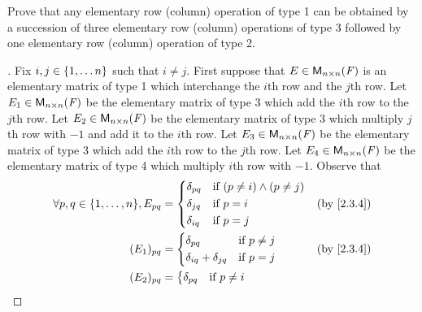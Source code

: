 \begin{ex}\label{ex:3.1.9}
  Prove that any elementary row (column) operation of type 1 can be obtained by a succession of three elementary row (column) operations of type 3 followed by one elementary row (column) operation of type 2.
\end{ex}

\begin{proof}[]
  Fix \(i, j \in \left\lbrace1, \dots n\right\rbrace\) such that \(i \neq j\).
  First suppose that \(E \in \ms[n][n][\F]\) is an elementary matrix of type 1 which interchange the \(i\)th row and the \(j\)th row.
  Let \(E_1 \in \ms[n][n][\F]\) be the elementary matrix of type 3 which add the \(i\)th row to the \(j\)th row.
  Let \(E_2 \in \ms[n][n][\F]\) be the elementary matrix of type 3 which multiply \(j\)th row with \(-1\) and add it to the \(i\)th row.
  Let \(E_3 \in \ms[n][n][\F]\) be the elementary matrix of type 3 which add the \(i\)th row to the \(j\)th row.
  Let \(E_4 \in \ms[n][n][\F]\) be the elementary matrix of type 4 which multiply \(i\)th row with \(-1\).
  Observe that
  \begin{align*}
    \forall p, q \in \set{1, \dots, n}, E_{p q} & = \begin{dcases}
                                                      \delta_{p q} & \text{if } (p \neq i) \land (p \neq j) \\
                                                      \delta_{j q} & \text{if } p = i                       \\
                                                      \delta_{i q} & \text{if } p = j
                                                    \end{dcases} &  & \by{2.3.4} \\
    (E_1)_{p q}                                 & = \begin{dcases}
                                                      \delta_{p q}                & \text{if } p \neq j \\
                                                      \delta_{i q} + \delta_{j q} & \text{if } p = j
                                                    \end{dcases}     &  & \by{2.3.4}     \\
    (E_2)_{p q}                                 & = \begin{dcases}
                                                      \delta_{p q}                 & \text{if } p \neq i \\

\end{dcases}
\end{align*}
\end{proof}
